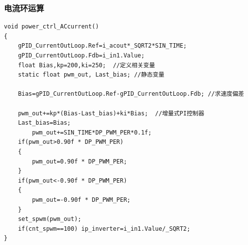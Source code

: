 \documentclass[a4paper,12pt]{article}
\begin{document}
\subsubsection*{电流环运算}
\begin{verbatim}
void power_ctrl_ACcurrent()
{
    gPID_CurrentOutLoop.Ref=i_acout*_SQRT2*SIN_TIME;
    gPID_CurrentOutLoop.Fdb=i_in1.Value;
    float Bias,kp=200,ki=250;  //定义相关变量
    static float pwm_out, Last_bias; //静态变量

    Bias=gPID_CurrentOutLoop.Ref-gPID_CurrentOutLoop.Fdb; //求速度偏差

    pwm_out+=kp*(Bias-Last_bias)+ki*Bias;  //增量式PI控制器
    Last_bias=Bias;  
        pwm_out+=SIN_TIME*DP_PWM_PER*0.1f;
    if(pwm_out>0.90f * DP_PWM_PER)
    {
        pwm_out=0.90f * DP_PWM_PER;
    }
    if(pwm_out<-0.90f * DP_PWM_PER)
    {
        pwm_out=-0.90f * DP_PWM_PER;
    }
    set_spwm(pwm_out);
    if(cnt_spwm==100) ip_inverter=i_in1.Value/_SQRT2;
}
\end{verbatim}
\end{document}
